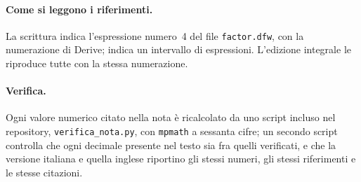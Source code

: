 \paragraph{Come si leggono i riferimenti.}
La scrittura  indica l'espressione numero~4 del file
\texttt{factor.dfw}, con la numerazione di Derive; 
indica un intervallo di espressioni. L'edizione integrale le riproduce tutte
con la stessa numerazione.

\paragraph{Verifica.}
Ogni valore numerico citato nella nota \`e ricalcolato da uno script incluso
nel repository, \texttt{verifica\_nota.py}, con \texttt{mpmath} a sessanta
cifre; un secondo script controlla che ogni decimale presente nel testo sia
fra quelli verificati, e che la versione italiana e quella inglese riportino
gli stessi numeri, gli stessi riferimenti e le stesse citazioni.
